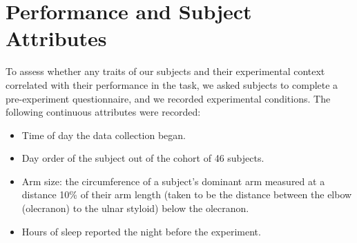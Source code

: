 \documentclass[../main.tex]{subfiles}
\begin{document}



\section{Performance and Subject Attributes}

To assess whether any traits of our subjects and their experimental context correlated with their performance in the task, we asked subjects to complete a pre-experiment questionnaire, and we recorded experimental conditions. The following continuous attributes were recorded:

\begin{itemize}
    \item Time of day the data collection began. %
    \item Day order of the subject out of the cohort of 46 subjects. %
    \item Arm size: the circumference of a subject's dominant arm measured at a distance 10\% of their arm length (taken to be the distance between the elbow (olecranon) to the ulnar styloid) below the olecranon. %
    \item Hours of sleep reported the night before the experiment. %
\end{itemize}
\end{document}
